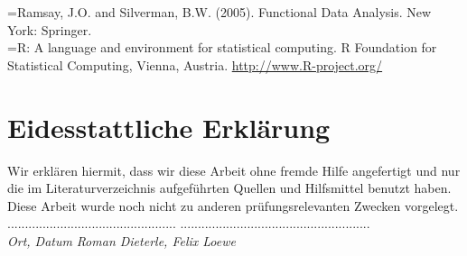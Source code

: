 \documentclass[a4paper,ngerman,oneside,titlepage,11pt]{scrreprt}
\theoremstyle{remark}
\begin{document}
\noindent \hangindent=\parindent [RS05] Ramsay, J.O. and Silverman, B.W. (2005). Functional Data Analysis. New York: Springer.\\

\noindent \hangindent=\parindent [R14] R: A language and environment for statistical computing. R Foundation for Statistical Computing, Vienna, Austria.
\url{http://www.R-project.org/}\\






\chapter*{Eidesstattliche Erklärung}

Wir erklären hiermit, dass wir diese Arbeit ohne fremde Hilfe angefertigt und nur die im Literaturverzeichnis aufgeführten Quellen und Hilfsmittel benutzt haben. Diese Arbeit wurde noch nicht zu anderen prüfungsrelevanten Zwecken vorgelegt.\\[1.5cm]




\noindent ................................................
\qquad\qquad\qquad\qquad\qquad
......................................................\\[0.5mm]
\textit{Ort, Datum}
\qquad\qquad\qquad\qquad\qquad\qquad\qquad\qquad\qquad
\textit{Roman Dieterle, Felix Loewe}
\end{document}

